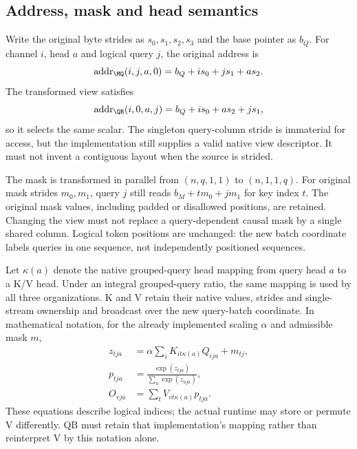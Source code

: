 \subsection{Address, mask and head semantics}
Write the original byte strides as $s_0,s_1,s_2,s_3$ and the base pointer as $b_Q$. For channel $i$, head $a$ and logical query $j$, the original address is
\begin{equation}
\operatorname{addr}_{\MQ}(i,j,a, 0)=b_Q+i s_0+j s_1+a s_2.
\end{equation}
The transformed view satisfies
\begin{equation}
\operatorname{addr}_{\QB}(i, 0,a,j)=b_Q+i s_0+a s_2+j s_1,
\label{eq:address}
\end{equation}
so it selects the same scalar. The singleton query-column stride is immaterial for access, but the implementation still supplies a valid native view descriptor. It must not invent a contiguous layout when the source is strided.

The mask is transformed in parallel from $(n,q, 1,1)$ to $(n, 1,1,q)$. For original mask strides $m_0,m_1$, query $j$ still reads $b_M+t m_0+j m_1$ for key index $t$. The original mask values, including padded or disallowed positions, are retained. Changing the view must not replace a query-dependent causal mask by a single shared column. Logical token positions are unchanged: the new batch coordinate labels queries in one sequence, not independently positioned sequences.

Let $\kappa(a)$ denote the native grouped-query head mapping from query head $a$ to a K/V head. Under an integral grouped-query ratio, the same mapping is used by all three organizations. K and V retain their native values, strides and single-stream ownership and broadcast over the new query-batch coordinate. In mathematical notation, for the already implemented scaling $\alpha$ and admissible mask $m$,
\begin{align}
 z_{tja}&=\alpha\sum_i K_{it\kappa(a)}Q_{ija}+m_{tj},\\
 p_{tja}&=\frac{\exp(z_{tja})}{\sum_u\exp(z_{uja})},\\
 O_{vja}&=\sum_t V_{vt\kappa(a)}p_{tja}.
\label{eq:attn}
\end{align}
These equations describe logical indices; the actual runtime may store or permute V differently. QB must retain that implementation's mapping rather than reinterpret V by this notation alone.

